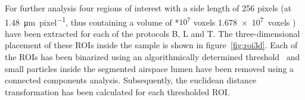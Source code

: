 \begin{figure}
%
	\else
	\fi
	\label{fig:BvsT}
\end{figure}

For further analysis four regions of interest with a side length of 256 pixels (at \SI{1.48}{\micro\meter\per pixel}, thus containing a volume of %
*$10^7$ voxels%
\else
	\SI{1.678e7}{voxels}%
\fi ) have been extracted for each of the protocols B, L and T. The three-dimensional placement of these ROIs inside the sample is shown in figure~\ref{fig:roi3d}. Each of the ROIs has been binarized using an algorithmically determined threshold~\cite{Otsu1979} and small particles inside the segmented airspace lumen have been removed using a connected components analysis. Subsequently, the euclidean distance transformation has been calculated for each thresholded ROI.

